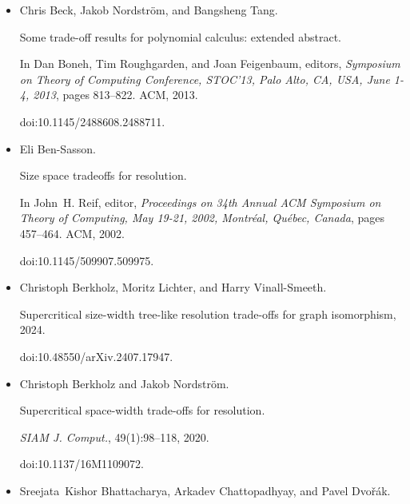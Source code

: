 \documentclass[10pt,a4paper]{article}
\begin{document}
\begin{itemize}
doi:10.4230/LIPICS.ITCS.2023.14.





\item[] 
[5]

Chris Beck, Jakob Nordström, and Bangsheng Tang.


Some trade-off results for polynomial calculus: extended abstract.


In Dan Boneh, Tim Roughgarden, and Joan Feigenbaum, editors, \emph{Symposium on Theory of Computing Conference, STOC’13, Palo Alto, CA, USA,
June 1-4, 2013}, pages 813–822. ACM, 2013.


doi:10.1145/2488608.2488711.





\item[] 
[6]

Eli Ben-Sasson.


Size space tradeoffs for resolution.


In John H. Reif, editor, \emph{Proceedings on 34th Annual ACM
Symposium on Theory of Computing, May 19-21, 2002, Montréal,
Québec, Canada}, pages 457–464. ACM, 2002.


doi:10.1145/509907.509975.





\item[] 
[7]

Christoph Berkholz, Moritz Lichter, and Harry Vinall-Smeeth.


Supercritical size-width tree-like resolution trade-offs for graph
isomorphism, 2024.


doi:10.48550/arXiv.2407.17947.





\item[] 
[8]

Christoph Berkholz and Jakob Nordström.


Supercritical space-width trade-offs for resolution.


\emph{SIAM J. Comput.}, 49(1):98–118, 2020.


doi:10.1137/16M1109072.





\item[] 
[9]

Sreejata Kishor Bhattacharya, Arkadev Chattopadhyay, and Pavel Dvořák.



\end{itemize}
\end{document}
